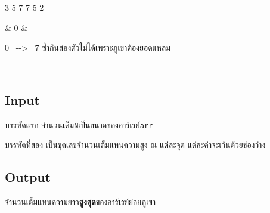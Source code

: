 \documentclass{article}
\begin{document}
{\begin{longtable}[]
\begin{minipage}[t]{\linewidth}
3 5 7 7 5 2\\

\strut

\end{minipage} & 0 & \begin{minipage}[t]{\linewidth}\raggedright

0~ -\/-\textgreater~ 7 ซ้ำกันสองตัวไม่ได้เพราะภูเขาต้องยอดแหลม\\

\strut

\end{minipage} \\

\end{longtable}

}



\subsection*{Input}
บรรทัดแรก จำนวนเต็ม\texttt{N}เป็นขนาดของอาร์เรย์\texttt{arr}



บรรทัดที่สอง เป็นชุดเลขจำนวนเต็มแทนความสูง ณ แต่ละจุด แต่ละค่าจะเว้นด้วยช่องว่าง



\subsection*{Output}
จำนวนเต็มแทนความยาว\ul{\textbf{สูงสุด}}ของอาร์เรย์ย่อยภูเขา\\
\end{document}
